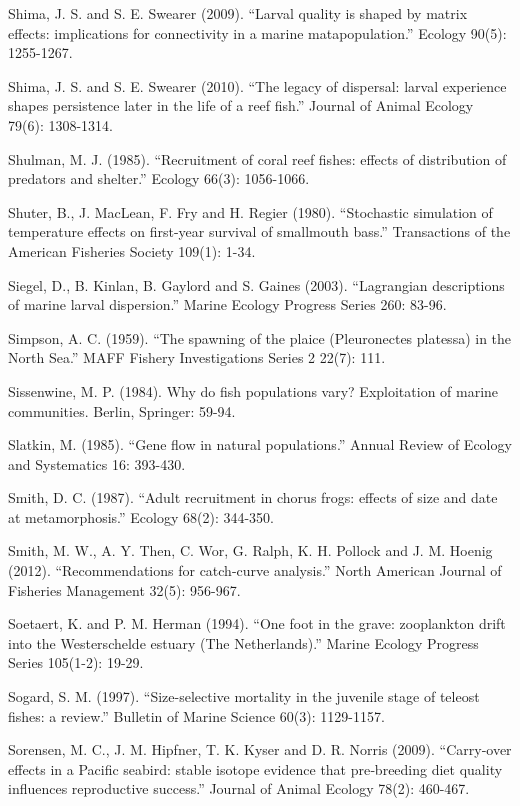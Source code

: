 \documentclass[]{book}
\begin{document}
Shima, J. S. and S. E. Swearer (2009). ``Larval quality is shaped by
matrix effects: implications for connectivity in a marine
matapopulation.'' Ecology 90(5): 1255-1267.

Shima, J. S. and S. E. Swearer (2010). ``The legacy of dispersal: larval
experience shapes persistence later in the life of a reef fish.''
Journal of Animal Ecology 79(6): 1308-1314.

Shulman, M. J. (1985). ``Recruitment of coral reef fishes: effects of
distribution of predators and shelter.'' Ecology 66(3): 1056-1066.

Shuter, B., J. MacLean, F. Fry and H. Regier (1980). ``Stochastic
simulation of temperature effects on first-year survival of smallmouth
bass.'' Transactions of the American Fisheries Society 109(1): 1-34.

Siegel, D., B. Kinlan, B. Gaylord and S. Gaines (2003). ``Lagrangian
descriptions of marine larval dispersion.'' Marine Ecology Progress
Series 260: 83-96.

Simpson, A. C. (1959). ``The spawning of the plaice (Pleuronectes
platessa) in the North Sea.'' MAFF Fishery Investigations Series 2
22(7): 111.

Sissenwine, M. P. (1984). Why do fish populations vary? Exploitation of
marine communities. Berlin, Springer: 59-94.

Slatkin, M. (1985). ``Gene flow in natural populations.'' Annual Review
of Ecology and Systematics 16: 393-430.

Smith, D. C. (1987). ``Adult recruitment in chorus frogs: effects of
size and date at metamorphosis.'' Ecology 68(2): 344-350.

Smith, M. W., A. Y. Then, C. Wor, G. Ralph, K. H. Pollock and J. M.
Hoenig (2012). ``Recommendations for catch-curve analysis.'' North
American Journal of Fisheries Management 32(5): 956-967.

Soetaert, K. and P. M. Herman (1994). ``One foot in the grave:
zooplankton drift into the Westerschelde estuary (The Netherlands).''
Marine Ecology Progress Series 105(1-2): 19-29.

Sogard, S. M. (1997). ``Size-selective mortality in the juvenile stage
of teleost fishes: a review.'' Bulletin of Marine Science 60(3):
1129-1157.

Sorensen, M. C., J. M. Hipfner, T. K. Kyser and D. R. Norris (2009).
``Carry‐over effects in a Pacific seabird: stable isotope evidence that
pre‐breeding diet quality influences reproductive success.'' Journal of
Animal Ecology 78(2): 460-467.
\end{document}
